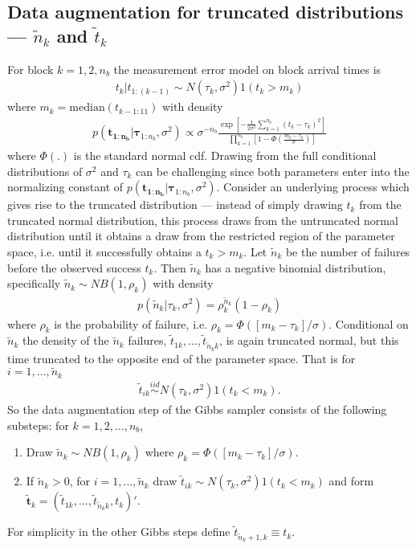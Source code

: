 \documentclass{article}
\begin{document}
\subsection{Data augmentation for truncated distributions --- $\widetilde{n}_k$ and $\widetilde{t}_k$}
For block $k=1,2,n_{b}$ the measurement error model on block arrival times is
\begin{align*}
t_k|t_{1:(k-1)} \sim N(\tau_k,\sigma^2)1(t_k > m_k)
\end{align*}
where $m_k = \mathrm{median}(t_{k - 1:11})$ with density 
\begin{align*}
p(\bm{t_{1:n_{b}}}|\bm{\tau}_{1:n_{b}},\sigma^2) \propto \sigma^{-n_{b}}\frac{\exp\left[-\frac{1}{2\sigma^2}\sum_{k=1}^{n_{b}}(t_k - \tau_k)^2\right]}{\prod_{k=1}^{n_{b}}\left[1 - \Phi\left(\frac{m_k - \tau_k}{\sigma}\right)\right]}
\end{align*}
where $\Phi(.)$ is the standard normal cdf. Drawing from the full conditional distributions of $\sigma^2$ and $\tau_k$ can be challenging since both parameters enter into the normalizing constant of $p(\bm{t_{1:n_{b}}}|\bm{\tau}_{1:n_{b}},\sigma^2)$. Consider an underlying process which gives rise to the truncated distribution --- instead of simply drawing $t_k$ from the truncated normal distribution, this process draws from the untruncated normal distribution until it obtains a draw from the restricted region of the parameter space, i.e. until it successfully obtains a $t_k > m_k$. Let $\widetilde{n}_k$ be the number of failures before the observed success $t_k$. Then $\widetilde{n}_k$ has a negative binomial distribution, specifically $\widetilde{n}_k \sim NB(1, \rho_k)$ with density
\begin{align*}
p(\widetilde{n}_k|\tau_k,\sigma^2) = \rho_k^{\widetilde{n}_k}(1 - \rho_k)
\end{align*}
where $\rho_k$ is the probability of failure, i.e. $\rho_k = \Phi([m_k - \tau_k]/\sigma)$. Conditional on $\widetilde{n}_k$ the density of the $\widetilde{n}_k$ failures, $\widetilde{t}_{1k},\dots,\widetilde{t}_{\widetilde{n}_kk}$, is again truncated normal, but this time truncated to the opposite end of the parameter space. That is for $i = 1,\dots,\widetilde{n}_k$
\begin{align*}
\widetilde{t}_{ik}\stackrel{iid}{\sim}N(\tau_k,\sigma^2)1(t_k < m_k).
\end{align*}
So the data augmentation step of the Gibbs sampler consists of the following substeps: for $k=1,2,\dots,n_{b}$,
\begin{enumerate}
\item Draw $\widetilde{n}_k \sim NB(1,\rho_k)$ where $\rho_k = \Phi([ m_k -  \tau_k]/\sigma)$.
\item If $\widetilde{n}_k > 0$, for $i=1,\dots,\widetilde{n}_k$ draw $\widetilde{t}_{ik} \sim N(\tau_k,\sigma^2)1(t_k < m_k)$ and form $\widetilde{\bm{t}}_k = (\widetilde{t}_{1k},\dots,\widetilde{t}_{\widetilde{n}_kk}, t_k)'$.
\end{enumerate}
For simplicity in the other Gibbs steps define $\widetilde{t}_{\widetilde{n}_k + 1,k}\equiv t_k$.
\end{document}
